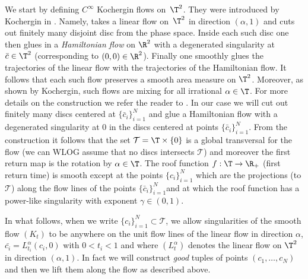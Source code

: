 \documentclass[JEP,XML,SOM,Unicode,NoFloatCountersInSection]{cedram}
\newcommand\cT{\mathcal{T}}
\theoremstyle{definition}
\theoremstyle{plain}
\begin{document}
We start by defining $C^\infty$ Kochergin flows on~$\T^2$. They were introduced by Kochergin in \cite{Koch}.
{ Namely,}
\cite{Koch} takes a linear flow on~$\T^2$ in direction $(\alpha,1)$ and cuts out finitely many disjoint disc from the phase space. Inside each such disc one then glues in a \emph{Hamiltonian flow} on $\R^2$ with a degenerated singularity at $\bar{c}\in \T^2$ (corresponding to $(0,0)\in \R^2$). Finally one smoothly glues the trajectories of the linear flow with the trajectories of the Hamiltonian flow. It follows that each such flow preserves a smooth area measure on $\T^2$. Moreover, as shown by Kochergin, such flows are mixing for all irrational $\alpha\in \T$. For more details on the construction we refer the reader to \cite{Koch}. In our case we will cut out finitely many discs centered at
$\{\bar{c}_i\}_{i=1}^N$ and glue a Hamiltonian flow with a degenerated singularity at $0$ in the discs centered at points $\{\bar{c}_i\}_{i=1}^N$. From the construction it follows that the set $\cT=\T\times\{0\}$ is a global transversal for the flow (we can WLOG assume that no discs intersects $\cT$) and moreover the first return map is the rotation by $\alpha\in \T$. The roof function $f:\T\to \R_+$ (first return time) is smooth except at { the points $\{c_i\}_{i=1}^N$ which are the projections (to $\cT$) along the flow lines of the points $\{\bar{c}_i\}_{i=1}^N$}and at which the roof function has a power-like singularity with exponent $\gamma \in (0,1)$.

In what follows, when we write $\{c_i\}_{i=1}^N\subset \cT$, we allow singularities of the smooth flow $(K_t)$ to be anywhere on the unit flow lines of the linear flow in direction $\alpha$, \ie $\bar{c_i}=L^{\alpha}_{t_i}(c_i,0)$ with $0<t_i<1$ and where $(L^\alpha_t)$ denotes the linear flow on $\T^2$ in direction $(\alpha,1)$.
In fact we will construct \emph{good} tuples of points $(c_1,\ldots, c_N)$ and then we lift them along the flow as described above.
\end{document}
